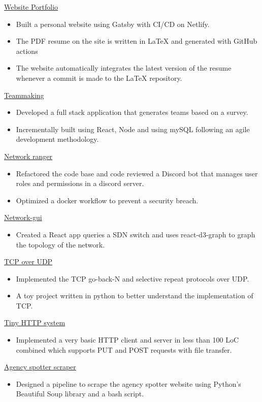 
\href{https://rsun.dev}{Website Portfolio}
\begin{itemize}
    \item Built a personal website using Gatsby with CI/CD on Netlify.
    \item The PDF resume on the site is written in \LaTeX{} and generated with GitHub actions
    \item The website automatically integrates the latest version of the resume whenever a commit is made to the \LaTeX{} repository.
\end{itemize}
    
\href{https://github.com/ngrover2/teammaking}{Teammaking}
\begin{itemize}
    \item Developed a full stack application that generates teams based on a survey.
    \item Incrementally built using React, Node and using mySQL following an agile development methodology.
\end{itemize}


\href{https://github.com/networking-discord/network-ranger}{Network ranger}
\begin{itemize}
    \item Refactored the code base and code reviewed a Discord bot that manages user roles and permissions in a discord server.
    \item Optimized  a docker workflow to prevent a security breach.
\end{itemize}
    
\href{https://github.com/rahul-sundaresan/network-gui/}{Network-gui}
\begin{itemize}
    \item Created a React app queries a SDN switch and uses react-d3-graph to graph the topology of the network.
\end{itemize}


\href{https://github.com/rahul-sundaresan/ccn-6166-p2}{TCP over UDP}
\begin{itemize}
    \item Implemented the TCP go-back-N and selective repeat protocols over UDP.
    \item  A toy project written in python to better understand the implementation of TCP.
\end{itemize}


\href{https://github.com/rahul-sundaresan/6166-project-1}{Tiny HTTP system}
\begin{itemize}
    \item Implemented a very basic HTTP client and server in less than 100 LoC combined which supports PUT and POST requests with file transfer.
\end{itemize}


\href{https://github.com/rahul-sundaresan/agency-spotter-scraper}{Agency spotter scraper}
\begin{itemize}
    \item Designed a pipeline to scrape the agency spotter website using Python's Beautiful Soup library and a bash script.
\end{itemize}

